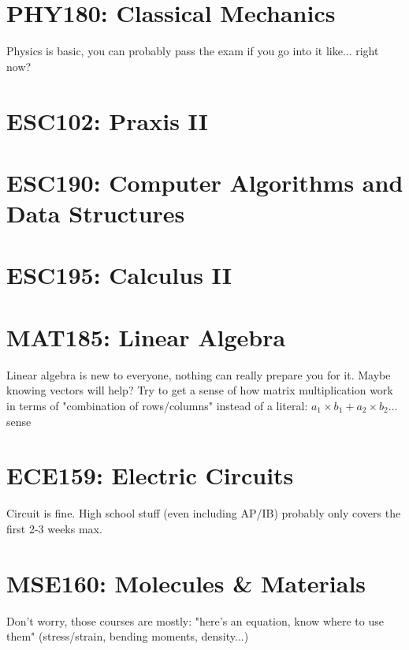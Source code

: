 \section{PHY180: Classical Mechanics}

Physics is basic, you can probably pass the exam if you go into it like... right now?

\section{ESC102: Praxis II}

\section{ESC190: Computer Algorithms and Data Structures}

\section{ESC195: Calculus II}

\section{MAT185: Linear Algebra}

Linear algebra is new to everyone, nothing can really prepare you for it. Maybe knowing vectors will help? Try to get a sense of how matrix multiplication work in terms of "combination of rows/columns" instead of a literal: $a_1\times b_1 + a_2\times b_2\dots$ sense

\section{ECE159: Electric Circuits}

Circuit is fine. High school stuff (even including AP/IB) probably only covers the first 2-3 weeks max.

\section{MSE160: Molecules \& Materials}

Don't worry, those courses are mostly: "here's an equation, know where to use them" (stress/strain, bending moments, density...)
